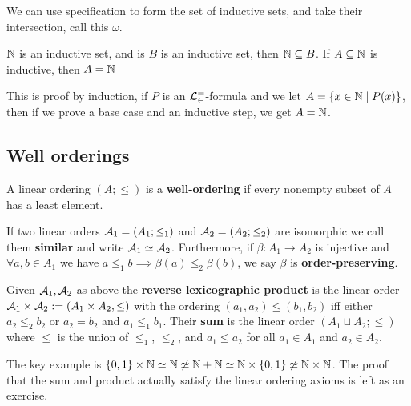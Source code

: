 \documentclass{article}
\begin{document}
\begin{definition}
    We can use specification to form the set of inductive sets, and take their intersection, call this $\omega$.
\end{definition}

\begin{proposition}
    $\mathbb{N}$ is an inductive set, and is $B$ is an inductive set, then $\mathbb{N}\subseteq B$. If $A\subseteq \mathbb{N}$ is inductive, then $A = \mathbb{N}$
\end{proposition}

This is proof by induction, if $P$ is an $\mathcal{L}_\in^=$-formula and we let $A = \{x \in \mathbb{N} \mid P(x)\}$, then if we prove a base case and an inductive step, we get $A = \mathbb{N}$.


\subsection{Well orderings}

\begin{definition}
    A linear ordering $(A;\leq)$ is a \textbf{well-ordering} if every nonempty subset of $A$ has a least element.
\end{definition}

\begin{definition}
    If two linear orders $\mathcal{A}_1 = (A_1;\leq_1)$ and $\mathcal{A}_2 = (A_2;\leq_2)$ are isomorphic we call them \textbf{similar} and write $\mathcal{A}_1\simeq \mathcal{A}_2$. Furthermore, if $\beta:A_1\rightarrow A_2$ is injective and $\forall a,b\in A_1$ we have $a\leq_1 b \implies \beta(a)\leq_2 \beta(b)$, we say $\beta$ is \textbf{order-preserving}.
\end{definition}

\begin{definition}
    Given $\mathcal{A}_1,\mathcal{A}_2$ as above the \textbf{reverse lexicographic product} is the linear order $\mathcal{A}_1\times \mathcal{A}_2 := (A_1\times A_2,\leq)$ with the ordering $(a_1,a_2)\leq (b_1,b_2)$ iff either $a_2\leq_2 b_2$ or $a_2 = b_2$ and $a_1\leq_1 b_1$. Their \textbf{sum} is the linear order $(A_1\sqcup A_2;\leq)$ where $\leq$ is the union of $\leq_1$, $\leq_2$, and $a_1\leq a_2$ for all $a_1\in A_1$ and $a_2\in A_2$.
\end{definition}

The key example is $\{0,1\}\times \mathbb{N} \simeq \mathbb{N}\not\simeq \mathbb{N} + \mathbb{N} \simeq \mathbb{N}\times\{0,1\} \not\simeq \mathbb{N} \times \mathbb{N}$. The proof that the sum and product actually satisfy the linear ordering axioms is left as an exercise.
\end{document}
